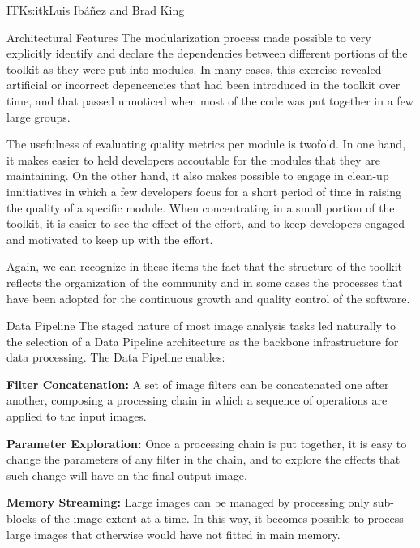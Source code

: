 \begin{aosachapter}{ITK}{s:itk}{Luis Ib\'{a}\~{n}ez and Brad King}
\begin{aosasect1}{Architectural Features}
The modularization process made possible to very explicitly identify and
declare the dependencies between different portions of the toolkit as they were
put into modules. In many cases, this exercise revealed artificial or incorrect
depencencies that had been introduced in the toolkit over time, and that passed
unnoticed when most of the code was put together in a few large groups.

The usefulness of evaluating quality metrics per module is twofold. In one
hand, it makes easier to held developers accoutable for the modules that they
are maintaining. On the other hand, it also makes possible to engage in
clean-up innitiatives in which a few developers focus for a short period of
time in raising the quality of a specific module. When concentrating in a small
portion of the toolkit, it is easier to see the effect of the effort, and to
keep developers engaged and motivated to keep up with the effort.

Again, we can recognize in these items the fact that the structure of the
toolkit reflects the organization of the community and in some cases the
processes that have been adopted for the continuous growth and quality control
of the software.

\begin{aosasect2}{Data Pipeline}\label{sec.itk.datapipeline}
The staged nature of most image analysis tasks led naturally to the selection
of a Data Pipeline architecture as the backbone infrastructure for data
processing. The Data Pipeline enables:

\begin{aosaitemize}

\item \textbf{Filter Concatenation:} A set of image filters can be concatenated
one after another, composing a processing chain in which a sequence of
operations are applied to the input images.

\item \textbf{Parameter Exploration:} Once a processing chain is put together,
it is easy to change the parameters of any filter in the chain, and to explore
the effects that such change will have on the final output image.

\item \textbf{Memory Streaming:} Large images can be managed by processing only
sub-blocks of the image extent at a time. In this way, it becomes possible to
process large images that otherwise would have not fitted in main memory.


\end{aosaitemize}
\end{aosasect2}
\end{aosasect1}
\end{aosachapter}
